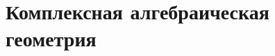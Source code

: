 \documentclass[dvipsnames, 11pt]{article}
\begin{document}
    
    
    
    
    
    
    
    

    \newpage
    \section{Комплексная алгебраическая геометрия}
    
    
    
    


    
\end{document}
